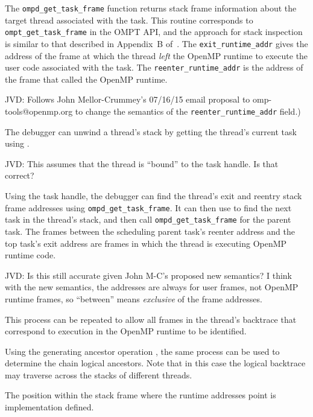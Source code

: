 The \verb|ompd_get_task_frame| function returns stack frame
information about the target thread associated with the task.
%
This routine corresponds to \verb|ompt_get_task_frame| in the OMPT
API, and the approach for stack inspection is similar to that
described in Appendix~B of~\cite{ompt-tr2}.
%
The \verb|exit_runtime_addr| gives the address of the frame at which
the thread \emph{left} the OpenMP runtime to execute the user code
associated with the task.
%
The \verb|reenter_runtime_addr| is the address of the frame that
called the OpenMP runtime.
\begin{notes}
JVD: Follows John Mellor-Crummey's
07/16/15 email proposal to omp-tools@openmp.org to change the
semantics of the \verb|reenter_runtime_addr| field.)
\end{notes}
%
The debugger can unwind a thread's stack by getting the
thread's current task using
.
\begin{notes}
JVD: This assumes that the thread is ``bound'' to the task
handle. Is that correct?
\end{notes}
%
Using the task handle, the debugger can find the thread's exit and
reentry stack frame addresses using \texttt{ompd\_get\_task\_frame}.
%
It can then use  to find the next task in the
thread's stack, and then call \verb|ompd_get_task_frame| for the parent task.
%
The frames between the scheduling parent task's reenter address and the top
task's exit address are frames in which the thread is executing OpenMP
runtime code.
\begin{notes}
JVD: Is this still accurate given John M-C's
proposed new semantics? I think with the new semantics, the addresses
are always for user frames, not OpenMP runtime frames, so ``between''
means \emph{exclusive} of the frame addresses.
\end{notes}
%
This process can be repeated to allow all frames in the thread's
backtrace that correspond to execution in the OpenMP runtime to be
identified.

Using the generating ancestor operation ,
the same process can be used to determine the chain logical ancestors.
Note that in this case the logical backtrace may traverse
across the stacks of different threads.

The position within the stack frame where the runtime addresses point
is implementation defined.
